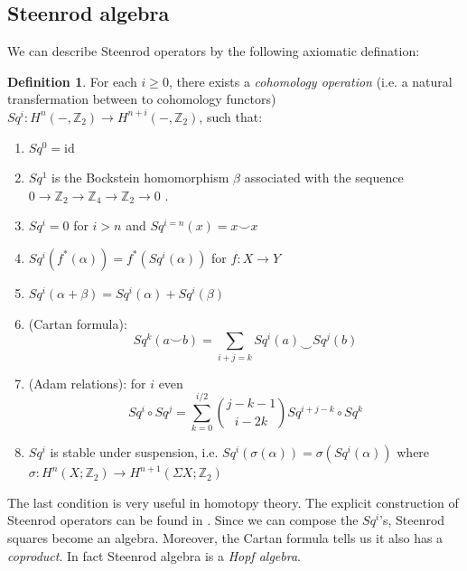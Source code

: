 \documentclass[a4paper,11pt]{article}
\theoremstyle{definition}
\newtheorem{definition}[theorem]{Definition}
\theoremstyle{remark}
\begin{document}
\subsection{Steenrod algebra}
\label{SA}
We can describe Steenrod operators by the following axiomatic defination:
\begin{definition}
	For each $i \geq 0$, there exists a {\itshape cohomology operation} (i.e. a natural transfermation between to cohomology functors) $Sq^i:H^n(-,\mathbb{Z}_2)\to H^{n+i}(-,\mathbb{Z}_2)$, such that:
	\begin{enumerate}
		\item $Sq^0=\mathrm{id}$
		\item $Sq^1$ is the Bockstein homomorphism $\beta$ associated with the sequence $0\to \mathbb{Z}_2\to \mathbb{Z}_4\to \mathbb{Z}_2\to0$ . 
		\item $Sq^{i}=0$ for $i>n$ and $Sq^{i=n}(x)= x\smile x$
		\item $Sq^i(f^*(\alpha))=f^*(Sq^i(\alpha))$ for $f:X\to Y$
		\item $Sq^i(\alpha+\beta)=Sq^i(\alpha)+Sq^i(\beta)$
		\item (Cartan formula): \[Sq^k(a\smile b)=\sum_{i+j=k}Sq^i(a)\smile Sq^j(b)\]
		\item (Adam relations): for $i$ even\[Sq^i\circ Sq^j=\sum_{k=0}^{i/2}\binom{j-k-1}{i-2k}Sq^{i+j-k}\circ Sq^k\]
		\item $Sq^i$ is stable under suspension, i.e. $Sq^i(\sigma(\alpha))=\sigma(Sq^i(\alpha))$ where $\sigma:H^n(X;\mathbb{Z}_2)\to H^{n+1}(\Sigma X;\mathbb{Z}_2)$
	\end{enumerate}
\end{definition}
The last condition is very useful in homotopy theory. The explicit construction of Steenrod operators can be found in \cite[\S 2]{mosher2008cohomology}. Since we can compose the $Sq^i$'s, Steenrod squares become an algebra. Moreover, the Cartan formula tells us it also has a {\itshape coproduct}. In fact Steenrod algebra is a {\itshape Hopf algebra}.
\end{document}
